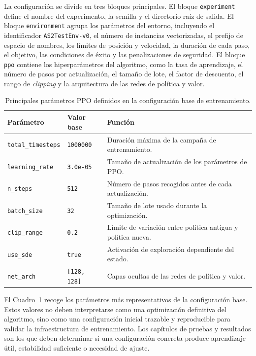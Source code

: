 La configuración se divide en tres bloques principales. El bloque
\texttt{experiment} define el nombre del experimento, la semilla y el directorio
raíz de salida. El bloque \texttt{environment} agrupa los parámetros del entorno,
incluyendo el identificador \texttt{AS2TestEnv-v0}, el número de instancias
vectorizadas, el prefijo de espacio de nombres, los límites de posición y
velocidad, la duración de cada paso, el objetivo, las condiciones de éxito y las
penalizaciones de seguridad. El bloque \texttt{ppo} contiene los hiperparámetros
del algoritmo, como la tasa de aprendizaje, el número de pasos por actualización,
el tamaño de lote, el factor de descuento, el rango de \emph{clipping} y la
arquitectura de las redes de política y valor.

\begin{table}[H]
\centering
\small
\setlength{\tabcolsep}{4pt}
\renewcommand{\arraystretch}{1.15}
\begin{tabular}{p{} p{} p{}}
\hline
\textbf{Parámetro} & \textbf{Valor base} & \textbf{Función} \\
\hline
\texttt{total\_timesteps} & \texttt{1000000} & Duración máxima de la campaña de entrenamiento. \\
\texttt{learning\_rate} & \texttt{3.0e-05} & Tamaño de actualización de los parámetros de PPO. \\
\texttt{n\_steps} & \texttt{512} & Número de pasos recogidos antes de cada actualización. \\
\texttt{batch\_size} & \texttt{32} & Tamaño de lote usado durante la optimización. \\
\texttt{clip\_range} & \texttt{0.2} & Límite de variación entre política antigua y política nueva. \\
\texttt{use\_sde} & \texttt{true} & Activación de exploración dependiente del estado. \\
\texttt{net\_arch} & \texttt{[128, 128]} & Capas ocultas de las redes de política y valor. \\
\hline
\end{tabular}
\caption{Principales parámetros PPO definidos en la configuración base de entrenamiento.}
\label{tab:aplicacion:parametros_ppo}
\end{table}

El Cuadro~\ref{tab:aplicacion:parametros_ppo} recoge los parámetros más
representativos de la configuración base. Estos valores no deben interpretarse
como una optimización definitiva del algoritmo, sino como una configuración
inicial trazable y reproducible para validar la infraestructura de entrenamiento.
Los capítulos de pruebas y resultados son los que deben determinar si una
configuración concreta produce aprendizaje útil, estabilidad suficiente o
necesidad de ajuste.

